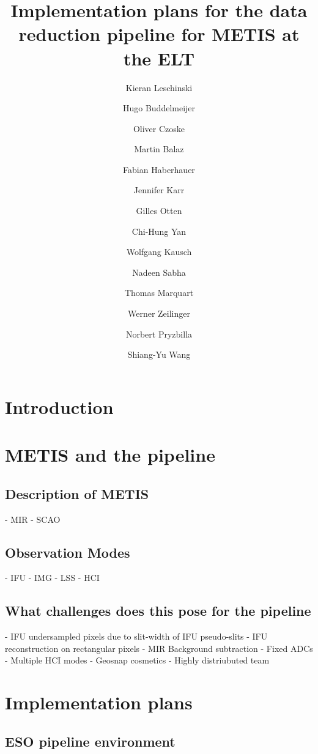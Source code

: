 \documentclass[]{spie}  %
\title{Implementation plans for the data reduction pipeline for METIS at the ELT }
\author[a]{Kieran Leschinski}
\author[a]{Hugo Buddelmeijer}
\author[a]{Oliver Czoske}
\author[a]{Martin Balaz}
\author[a]{Fabian Haberhauer}
\author[a]{Jennifer Karr}
\author[a]{Gilles Otten}
\author[a]{Chi-Hung Yan}
\author[a]{Wolfgang Kausch}
\author[a]{Nadeen Sabha}
\author[a]{Thomas Marquart}
\author[a]{Werner Zeilinger}
\author[a]{Norbert Pryzbilla}
\author[a]{Shiang-Yu Wang}
\affil[a]{University of Vienna, T\"urkenschanztra\ss e 18, 1180 Vienna, Austria}
\begin{document}
 
\maketitle

\begin{abstract}

\end{abstract}



\section{Introduction}
\label{sec:introduction}


\section{METIS and the pipeline}
\label{sec:environment}

\subsection{Description of METIS}
\label{ssec:env_metis}
	- MIR
	- SCAO
\subsection{Observation Modes}
\label{ssec:env_modes}
	- IFU
	- IMG
	- LSS
	- HCI
 
\subsection{What challenges does this pose for the pipeline}
\label{ssec:env_challenges}

- IFU undersampled pixels due to slit-width of IFU pseudo-slits
		- IFU reconstruction on rectangular pixels
	- MIR Background subtraction
	- Fixed ADCs
	- Multiple HCI modes
	- Geosnap cosmetics
	- Highly distriubuted team


\section{Implementation plans}
\label{sec:implementation}

\subsection{ESO pipeline environment}
\label{ssec:imp_eso}
\end{document}
